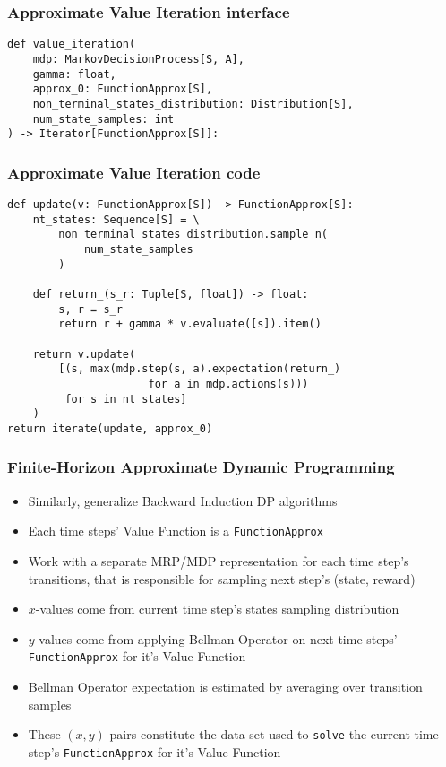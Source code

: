 \documentclass[handout]{beamer}
\begin{document}
\begin{frame}[fragile]
\frametitle{Approximate Value Iteration interface}
\pause
\begin{lstlisting}
def value_iteration(
    mdp: MarkovDecisionProcess[S, A],
    gamma: float,
    approx_0: FunctionApprox[S],
    non_terminal_states_distribution: Distribution[S],
    num_state_samples: int
) -> Iterator[FunctionApprox[S]]:
\end{lstlisting}
\end{frame}

\begin{frame}[fragile]
\frametitle{Approximate Value Iteration code}
\pause
\begin{lstlisting}
def update(v: FunctionApprox[S]) -> FunctionApprox[S]:
    nt_states: Sequence[S] = \
        non_terminal_states_distribution.sample_n(
            num_state_samples
        )

    def return_(s_r: Tuple[S, float]) -> float:
        s, r = s_r
        return r + gamma * v.evaluate([s]).item()

    return v.update(
        [(s, max(mdp.step(s, a).expectation(return_)
                      for a in mdp.actions(s)))
         for s in nt_states]
    )
return iterate(update, approx_0)
\end{lstlisting}
\end{frame}



\begin{frame}
\frametitle{Finite-Horizon Approximate Dynamic Programming}
\pause
\begin{itemize}[<+->]
\item Similarly, generalize Backward Induction DP algorithms
\item Each time steps' Value Function is a \lstinline{FunctionApprox}
\item Work with a separate MRP/MDP representation for each time step's transitions, that is responsible for sampling next step's (state, reward)
\item $x$-values come from current time step's states sampling distribution
\item $y$-values come from applying Bellman Operator on next time steps' \lstinline{FunctionApprox} for it's Value Function
\item  Bellman Operator expectation is estimated by averaging over transition samples
\item These $(x,y)$ pairs constitute the data-set used to \lstinline{solve} the current time step's \lstinline{FunctionApprox} for it's Value Function
\end{itemize}
\end{frame}
\end{document}

